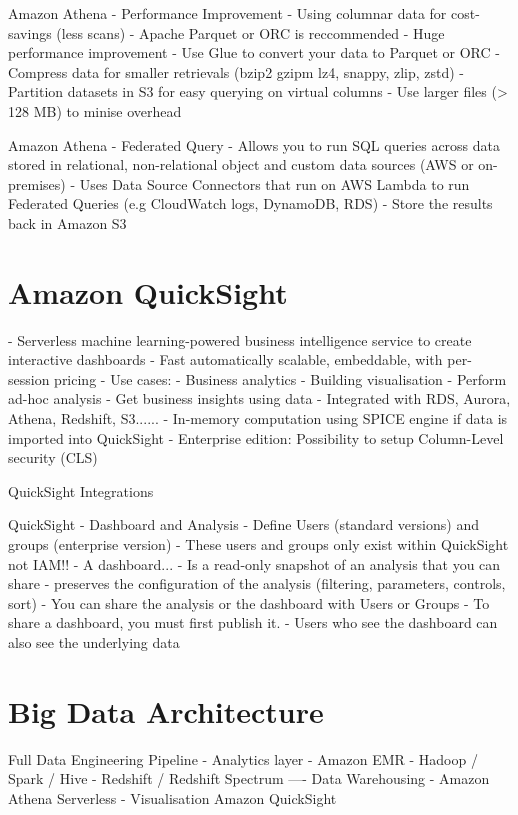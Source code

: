 \documentclass[11pt]{book}
\begin{document}
    Amazon Athena - Performance Improvement
    - Using columnar data for cost-savings (less scans)
        - Apache Parquet or ORC is reccommended
        - Huge performance improvement
        - Use Glue to convert your data to Parquet or ORC
    - Compress data for smaller retrievals (bzip2 gzipm lz4, snappy, zlip, zstd)
    - Partition datasets in S3 for easy querying on virtual columns
    - Use larger files (> 128 MB) to minise overhead

    Amazon Athena - Federated Query
    - Allows you to run SQL queries across data stored in relational, non-relational object and custom data sources (AWS or on-premises)
    - Uses Data Source Connectors that run on AWS Lambda to run Federated Queries (e.g CloudWatch logs, DynamoDB, RDS)
    - Store the results back in Amazon S3

    \section{Amazon QuickSight}
    - Serverless machine learning-powered business intelligence service to create interactive dashboards
    - Fast automatically scalable, embeddable, with per-session pricing
    - Use cases:
        - Business analytics
        - Building visualisation
        - Perform ad-hoc analysis
        - Get business insights using data
    - Integrated with RDS, Aurora, Athena, Redshift, S3......
    - In-memory computation using SPICE engine if data is imported into QuickSight
    - Enterprise edition: Possibility to setup Column-Level security (CLS)

    QuickSight Integrations

    QuickSight - Dashboard and Analysis
    - Define Users (standard versions) and groups (enterprise version)
        - These users and groups only exist within QuickSight not IAM!!
    - A dashboard...
        - Is a read-only snapshot of an analysis that you can share
        - preserves the configuration of the analysis (filtering, parameters, controls, sort)
    - You can share the analysis or the dashboard with Users or Groups
    - To share a dashboard, you must first publish it.
    - Users who see the dashboard can also see the underlying data

    \section{Big Data Architecture}
    Full Data Engineering Pipeline - Analytics layer
    - Amazon EMR - Hadoop / Spark / Hive
    - Redshift / Redshift Spectrum ---- Data Warehousing
    - Amazon Athena Serverless
    - Visualisation Amazon QuickSight
\end{document}
